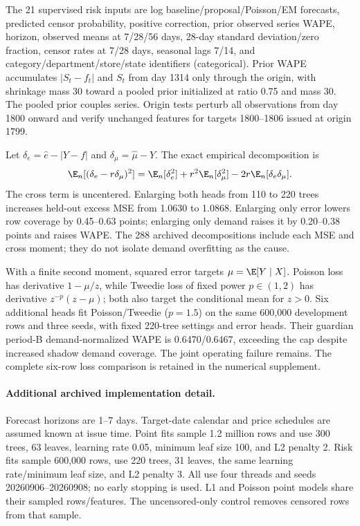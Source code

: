 The 21 supervised risk inputs are log baseline/proposal/Poisson/EM forecasts, predicted censor probability, positive correction, prior observed series WAPE, horizon, observed means at 7/28/56 days, 28-day standard deviation/zero fraction, censor rates at 7/28 days, seasonal lags 7/14, and category/department/store/state identifiers (categorical). Prior WAPE accumulates $|S_t-f_t|$ and $S_t$ from day 1314 only through the origin, with shrinkage mass 30 toward a pooled prior initialized at ratio 0.75 and mass 30. The pooled prior couples series. Origin tests perturb all observations from day 1800 onward and verify unchanged features for targets 1800--1806 issued at origin 1799.

Let $\delta_e=\hat e-|Y-f|$ and $\delta_\mu=\hat\mu-Y$. The exact empirical decomposition is
\[
 \E_n[(\delta_e-r\delta_\mu)^2]=\E_n[\delta_e^2]+r^2\E_n[\delta_\mu^2]-2r\E_n[\delta_e\delta_\mu].
\]
The cross term is uncentered. Enlarging both heads from 110 to 220 trees increases held-out excess MSE from 1.0630 to 1.0868. Enlarging only error lowers row coverage by 0.45--0.63 points; enlarging only demand raises it by 0.20--0.38 points and raises WAPE. The 288 archived decompositions include each MSE and cross moment; they do not isolate demand overfitting as the cause.

With a finite second moment, squared error targets $\mu=\E[Y\mid X]$. Poisson loss has derivative $1-\mu/z$, while Tweedie loss of fixed power $p\in(1,2)$ has derivative $z^{-p}(z-\mu)$; both also target the conditional mean for $z>0$. Six additional heads fit Poisson/Tweedie ($p=1.5$) on the same 600,000 development rows and three seeds, with fixed 220-tree settings and error heads. Their guardian period-B demand-normalized WAPE is 0.6470/0.6467, exceeding the cap despite increased shadow demand coverage. The joint operating failure remains.
The complete six-row loss comparison is retained in the numerical supplement.

\paragraph{Additional archived implementation detail.}
Forecast horizons are 1--7 days. Target-date calendar and price schedules are assumed known at issue time. Point fits sample 1.2 million rows and use 300 trees, 63 leaves, learning rate 0.05, minimum leaf size 100, and L2 penalty 2. Risk fits sample 600,000 rows, use 220 trees, 31 leaves, the same learning rate/minimum leaf size, and L2 penalty 3. All use four threads and seeds 20260906--20260908; no early stopping is used. L1 and Poisson point models share their sampled rows/features. The uncensored-only control removes censored rows from that sample.

